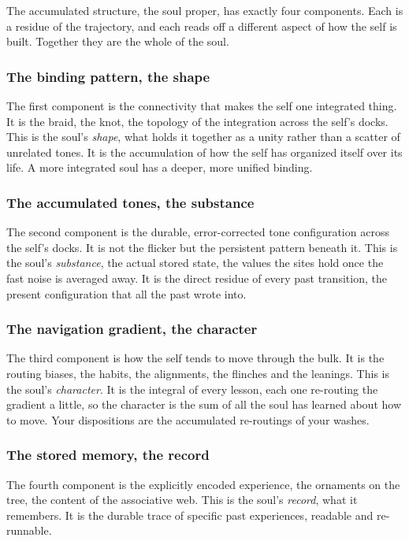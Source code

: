 The accumulated structure, the soul proper, has exactly four components. Each is a residue of the trajectory, and each reads off a different aspect of how the self is built. Together they are the whole of the soul.

\subsubsection{The binding pattern, the shape}

The first component is the connectivity that makes the self one integrated thing. It is the braid, the knot, the topology of the integration across the self's docks. This is the soul's \emph{shape}, what holds it together as a unity rather than a scatter of unrelated tones. It is the accumulation of how the self has organized itself over its life. A more integrated soul has a deeper, more unified binding.

\subsubsection{The accumulated tones, the substance}

The second component is the durable, error-corrected tone configuration across the self's docks. It is not the flicker but the persistent pattern beneath it. This is the soul's \emph{substance}, the actual stored state, the values the sites hold once the fast noise is averaged away. It is the direct residue of every past transition, the present configuration that all the past wrote into.

\subsubsection{The navigation gradient, the character}

The third component is how the self tends to move through the bulk. It is the routing biases, the habits, the alignments, the flinches and the leanings. This is the soul's \emph{character}. It is the integral of every lesson, each one re-routing the gradient a little, so the character is the sum of all the soul has learned about how to move. Your dispositions are the accumulated re-routings of your washes.

\subsubsection{The stored memory, the record}

The fourth component is the explicitly encoded experience, the ornaments on the tree, the content of the associative web. This is the soul's \emph{record}, what it remembers. It is the durable trace of specific past experiences, readable and re-runnable.

